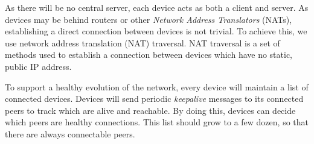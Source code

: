 As there will be no central server, each device acts as both a client and server. As devices may be behind routers or other \textit{Network Address Translators} (NATs), establishing a direct connection between devices is not trivial. To achieve this, we use network address translation (NAT) traversal. NAT traversal is a set of methods used to establish a connection between devices which have no static, public IP address.

To support a healthy evolution of the network, every device will maintain a list of connected devices. Devices will send periodic \textit{keepalive} messages to its connected peers to track which are alive and reachable. By doing this, devices can decide which peers are healthy connections. This list should grow to a few dozen, so that there are always connectable peers.







